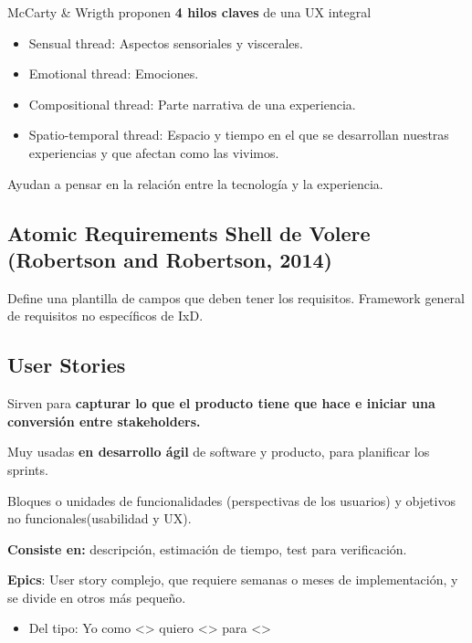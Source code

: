 McCarty \& Wrigth proponen \textbf{4 hilos claves} de una UX integral

\begin{itemize}
\tightlist
\item
  Sensual thread: Aspectos sensoriales y viscerales.
\item
  Emotional thread: Emociones.
\item
  Compositional thread: Parte narrativa de una experiencia.
\item
  Spatio-temporal thread: Espacio y tiempo en el que se desarrollan
  nuestras experiencias y que afectan como las vivimos.
\end{itemize}

Ayudan a pensar en la relación entre la tecnología y la experiencia.

\hypertarget{atomic-requirements-shell-de-volere-robertson-and-robertson-2014}{%
\subsection{Atomic Requirements Shell de Volere (Robertson and
Robertson,
2014)}\label{atomic-requirements-shell-de-volere-robertson-and-robertson-2014}}

Define una plantilla de campos que deben tener los requisitos. Framework
general de requisitos no específicos de IxD.

\hypertarget{user-stories}{%
\subsection{User Stories}\label{user-stories}}

Sirven para \textbf{capturar lo que el producto tiene que hace e iniciar
una conversión entre stakeholders.}

Muy usadas \textbf{en desarrollo ágil} de software y producto, para
planificar los sprints.

Bloques o unidades de funcionalidades (perspectivas de los usuarios) y
objetivos no funcionales(usabilidad y UX).

\textbf{Consiste en:} descripción, estimación de tiempo, test para
verificación.

\textbf{Epics}: User story complejo, que requiere semanas o meses de
implementación, y se divide en otros más pequeño.

\begin{itemize}
\tightlist
\item
  Del tipo: Yo como \textless\textgreater{} quiero
  \textless\textgreater{} para \textless\textgreater{}
\end{itemize}

